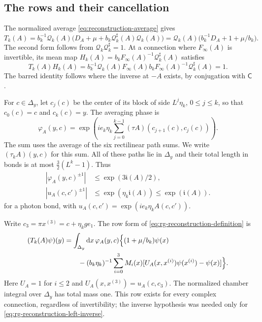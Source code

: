 \subsection{The rows and their cancellation}
The normalized average \eqref{eq:reconstruction-average} gives
\begin{equation}\label{eq:rg-reconstruction-definition}
 T_k(A)=b_k^{-1}\mathcal Q_k(A)
            \big(D_A+\mu+b_k\mathcal Q_k^\sharp(A)\mathcal Q_k(A)\big)
       =\mathcal Q_k(A)\big(b_k^{-1}D_A+1+\mu/b_k\big).
\end{equation}
The second form follows from
$\mathcal Q_k\mathcal Q_k^\sharp=1$.
At a connection where $F_\infty(A)$ is invertible, its mean map
$H_k(A)=b_kF_\infty(A)^{-1}\mathcal Q_k^\sharp(A)$ satisfies
\begin{equation}\label{eq:rg-reconstruction-left-inverse}
 T_k(A)H_k(A)
 =b_k^{-1}\mathcal Q_k(A)F_\infty(A)
               b_kF_\infty(A)^{-1}\mathcal Q_k^\sharp(A)=1.
\end{equation}
The barred identity follows where the inverse at $-A$ exists,
by conjugation with $\mathsf C$.

For $c\in\Delta_y$, let $c_j(c)$ be the center of its block
of side $L^j\eta_k$, $0\le j\le k$, so that $c_0(c)=c$ and
$c_k(c)=y$. The averaging phase is
\begin{equation}\label{eq:rg-reconstruction-phase}
 \varphi_A(y,c)=\exp\left(ie_k\eta_k
                 \sum_{j=0}^{k-1}(\tau A)(c_{j+1}(c),c_j(c))\right).
\end{equation}
The sum uses the average of the six rectilinear path sums.
We write $(\tau_kA)(y,c)$ for this sum.
All of these paths lie in $\Delta_y$ and their total length
in bonds is at most $\frac32(L^k-1)$. Thus
\begin{equation}\label{eq:rg-reconstruction-phase-moduli}
 \begin{aligned}
 |\varphi_A(y,c)^{\pm1}|&\le\exp(3\mathfrak i(A)/2),\\
 |u_A(c,c')^{\pm1}|&\le\exp(\eta_k\mathfrak i(A))
                                             \le\exp(\mathfrak i(A)).
 \end{aligned}
\end{equation}
for a photon bond, with $u_A(c,c')=\exp(ie_k\eta_k A(c,c'))$.

Write \(c_3=\pi x^{(3)}=c+\eta_kge_1\). The row form of
\eqref{eq:rg-reconstruction-definition} is
\begin{equation}\label{eq:rg-reconstruction-row}
 \begin{aligned}
 (T_k(A)\psi)(y)
 &=\int_{\Delta_y}\mathrm d x\,\varphi_A(y,c)
                  \Bigl\{(1+\mu/b_k)\psi(x)\\
 &\qquad-(b_k\eta_k)^{-1}\sum_{i=0}^3M_i(x)
           [U_A(x,x^{(i)})\psi(x^{(i)})-\psi(x)]\Bigr\}.
 \end{aligned}
\end{equation}
Here $U_A=1$ for $i\le2$ and $U_A(x,x^{(3)})=u_A(c,c_3)$.
The normalized chamber integral over $\Delta_y$ has total mass
one. This row exists for every complex connection, regardless
of invertibility; the inverse hypothesis was needed only for
\eqref{eq:rg-reconstruction-left-inverse}.

